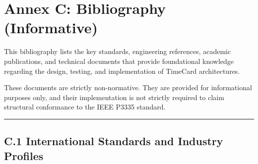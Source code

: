 \documentclass[
]{article}
\author{}
\date{}
\begin{document}
\section{Annex C: Bibliography
(Informative)}\label{annex-c-bibliography-informative}

This bibliography lists the key standards, engineering references,
academic publications, and technical documents that provide foundational
knowledge regarding the design, testing, and implementation of TimeCard
architectures.

These documents are strictly non-normative. They are provided for
informational purposes only, and their implementation is not strictly
required to claim structural conformance to the IEEE P3335 standard.

\begin{center}\rule{0.5\linewidth}{0.5pt}\end{center}

\subsection{C.1 International Standards and Industry
Profiles}\label{c.1-international-standards-and-industry-profiles}
\end{document}

